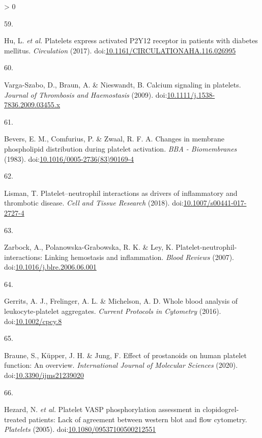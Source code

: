 \documentclass[11pt,twoside]{bristolthesis}
\newlength{\cslhangindent}
\newlength{\csllabelwidth}
\newenvironment{CSLReferences}[2] %
 {%
  \setlength{\parindent}{0pt}
  \ifodd #1 \everypar{\setlength{\hangindent}{\cslhangindent}}\ignorespaces\fi
  \ifnum #2 > 0
  \setlength{\parskip}{#2\baselineskip}
  \fi
 }%
 {}
\newcommand{\CSLLeftMargin}[1]{\parbox[t]{\csllabelwidth}{#1}}
\newcommand{\CSLRightInline}[1]{\parbox[t]{\linewidth - \csllabelwidth}{#1}\break}
\begin{document}
\begin{CSLReferences}{0}{0}
\leavevmode\hypertarget{ref-Hu2017}{}%
\CSLLeftMargin{59. }
\CSLRightInline{Hu, L. \emph{et al.} Platelets express activated P2Y12 receptor in patients with diabetes mellitus. \emph{Circulation} (2017). doi:\href{https://doi.org/10.1161/CIRCULATIONAHA.116.026995}{10.1161/CIRCULATIONAHA.116.026995}}

\leavevmode\hypertarget{ref-Varga-Szabo2009}{}%
\CSLLeftMargin{60. }
\CSLRightInline{Varga-Szabo, D., Braun, A. \& Nieswandt, B. Calcium signaling in platelets. \emph{Journal of Thrombosis and Haemostasis} (2009). doi:\href{https://doi.org/10.1111/j.1538-7836.2009.03455.x}{10.1111/j.1538-7836.2009.03455.x}}

\leavevmode\hypertarget{ref-Bevers1983}{}%
\CSLLeftMargin{61. }
\CSLRightInline{Bevers, E. M., Comfurius, P. \& Zwaal, R. F. A. Changes in membrane phospholipid distribution during platelet activation. \emph{BBA - Biomembranes} (1983). doi:\href{https://doi.org/10.1016/0005-2736(83)90169-4}{10.1016/0005-2736(83)90169-4}}

\leavevmode\hypertarget{ref-Lisman2018}{}%
\CSLLeftMargin{62. }
\CSLRightInline{Lisman, T. Platelet--neutrophil interactions as drivers of inflammatory and thrombotic disease. \emph{Cell and Tissue Research} (2018). doi:\href{https://doi.org/10.1007/s00441-017-2727-4}{10.1007/s00441-017-2727-4}}

\leavevmode\hypertarget{ref-Zarbock2007}{}%
\CSLLeftMargin{63. }
\CSLRightInline{Zarbock, A., Polanowska-Grabowska, R. K. \& Ley, K. Platelet-neutrophil-interactions: Linking hemostasis and inflammation. \emph{Blood Reviews} (2007). doi:\href{https://doi.org/10.1016/j.blre.2006.06.001}{10.1016/j.blre.2006.06.001}}

\leavevmode\hypertarget{ref-Gerrits2016}{}%
\CSLLeftMargin{64. }
\CSLRightInline{Gerrits, A. J., Frelinger, A. L. \& Michelson, A. D. Whole blood analysis of leukocyte-platelet aggregates. \emph{Current Protocols in Cytometry} (2016). doi:\href{https://doi.org/10.1002/cpcy.8}{10.1002/cpcy.8}}

\leavevmode\hypertarget{ref-Braune2020}{}%
\CSLLeftMargin{65. }
\CSLRightInline{Braune, S., Küpper, J. H. \& Jung, F. Effect of prostanoids on human platelet function: An overview. \emph{International Journal of Molecular Sciences} (2020). doi:\href{https://doi.org/10.3390/ijms21239020}{10.3390/ijms21239020}}

\leavevmode\hypertarget{ref-Hezard2005}{}%
\CSLLeftMargin{66. }
\CSLRightInline{Hezard, N. \emph{et al.} Platelet VASP phosphorylation assessment in clopidogrel-treated patients: Lack of agreement between western blot and flow cytometry. \emph{Platelets} (2005). doi:\href{https://doi.org/10.1080/09537100500212551}{10.1080/09537100500212551}}


\end{CSLReferences}
\end{document}
